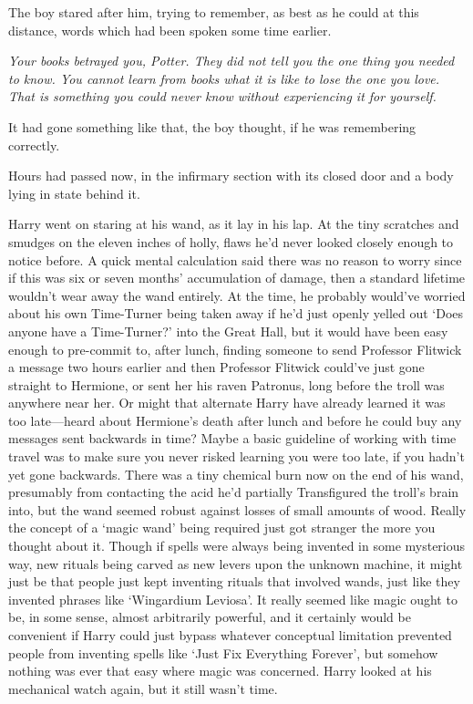 The boy stared after him, trying to remember, as best as he could at this distance, words which had been spoken some time earlier.

\emph{Your books betrayed you, Potter. They did not tell you the one thing you needed to know. You cannot learn from books what it is like to lose the one you love. That is something you could never know without experiencing it for yourself.}

It had gone something like that, the boy thought, if he was remembering correctly.

\later

Hours had passed now, in the infirmary section with its closed door and a body lying in state behind it.

Harry went on staring at his wand, as it lay in his lap. At the tiny scratches and smudges on the eleven inches of holly, flaws he’d never looked closely enough to notice before. A quick mental calculation said there was no reason to worry since if this was six or seven months’ accumulation of damage, then a standard lifetime wouldn’t wear away the wand entirely. At the time, he probably would’ve worried about his own Time-Turner being taken away if he’d just openly yelled out ‘Does anyone have a Time-Turner?’ into the Great Hall, but it would have been easy enough to pre-commit to, after lunch, finding someone to send Professor Flitwick a message two hours earlier and then Professor Flitwick could’ve just gone straight to Hermione, or sent her his raven Patronus, long before the troll was anywhere near her. Or might that alternate Harry have already learned it was too late—heard about Hermione’s death after lunch and before he could buy any messages sent backwards in time? Maybe a basic guideline of working with time travel was to make sure you never risked learning you were too late, if you hadn’t yet gone backwards. There was a tiny chemical burn now on the end of his wand, presumably from contacting the acid he’d partially Transfigured the troll’s brain into, but the wand seemed robust against losses of small amounts of wood. Really the concept of a ‘magic wand’ being required just got stranger the more you thought about it. Though if spells were always being invented in some mysterious way, new rituals being carved as new levers upon the unknown machine, it might just be that people just kept inventing rituals that involved wands, just like they invented phrases like ‘Wingardium Leviosa’. It really seemed like magic ought to be, in some sense, almost arbitrarily powerful, and it certainly would be convenient if Harry could just bypass whatever conceptual limitation prevented people from inventing spells like ‘Just Fix Everything Forever’, but somehow nothing was ever that easy where magic was concerned. Harry looked at his mechanical watch again, but it still wasn’t time.

